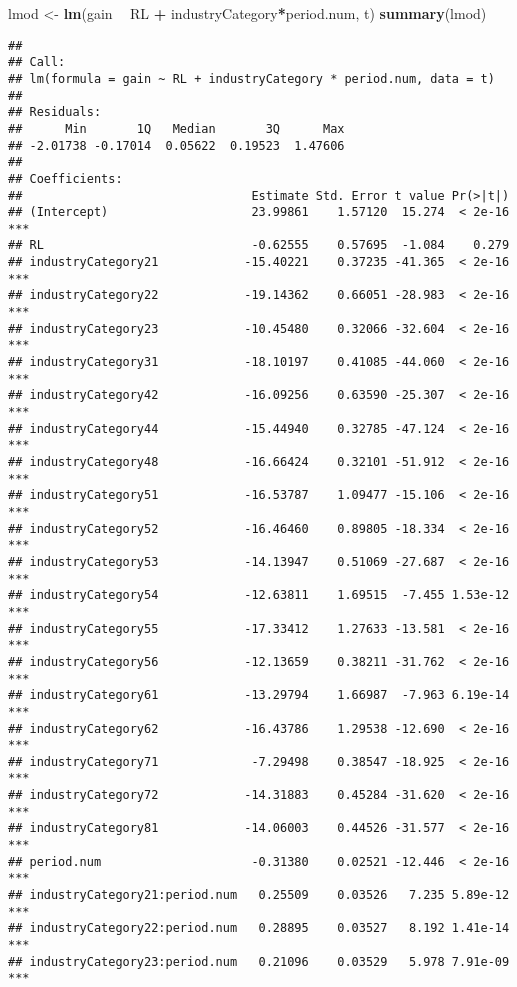 \documentclass[
]{article}
\newenvironment{Shaded}{\begin{snugshade}}{\end{snugshade}}
\newcommand{\KeywordTok}[1]{\textcolor[rgb]{0.13,0.29,0.53}{\textbf{#1}}}
\newcommand{\NormalTok}[1]{#1}
\newcommand{\OperatorTok}[1]{\textcolor[rgb]{0.81,0.36,0.00}{\textbf{#1}}}
\newcommand{\StringTok}[1]{\textcolor[rgb]{0.31,0.60,0.02}{#1}}
\begin{document}
\begin{Shaded}
\begin{Highlighting}[]
\NormalTok{lmod <-}\StringTok{ }\KeywordTok{lm}\NormalTok{(gain }\OperatorTok{~}\StringTok{ }\NormalTok{RL }\OperatorTok{+}\StringTok{ }\NormalTok{industryCategory}\OperatorTok{*}\NormalTok{period.num, t)}
\KeywordTok{summary}\NormalTok{(lmod)}
\end{Highlighting}
\end{Shaded}

\begin{verbatim}
## 
## Call:
## lm(formula = gain ~ RL + industryCategory * period.num, data = t)
## 
## Residuals:
##      Min       1Q   Median       3Q      Max 
## -2.01738 -0.17014  0.05622  0.19523  1.47606 
## 
## Coefficients:
##                                Estimate Std. Error t value Pr(>|t|)    
## (Intercept)                    23.99861    1.57120  15.274  < 2e-16 ***
## RL                             -0.62555    0.57695  -1.084    0.279    
## industryCategory21            -15.40221    0.37235 -41.365  < 2e-16 ***
## industryCategory22            -19.14362    0.66051 -28.983  < 2e-16 ***
## industryCategory23            -10.45480    0.32066 -32.604  < 2e-16 ***
## industryCategory31            -18.10197    0.41085 -44.060  < 2e-16 ***
## industryCategory42            -16.09256    0.63590 -25.307  < 2e-16 ***
## industryCategory44            -15.44940    0.32785 -47.124  < 2e-16 ***
## industryCategory48            -16.66424    0.32101 -51.912  < 2e-16 ***
## industryCategory51            -16.53787    1.09477 -15.106  < 2e-16 ***
## industryCategory52            -16.46460    0.89805 -18.334  < 2e-16 ***
## industryCategory53            -14.13947    0.51069 -27.687  < 2e-16 ***
## industryCategory54            -12.63811    1.69515  -7.455 1.53e-12 ***
## industryCategory55            -17.33412    1.27633 -13.581  < 2e-16 ***
## industryCategory56            -12.13659    0.38211 -31.762  < 2e-16 ***
## industryCategory61            -13.29794    1.66987  -7.963 6.19e-14 ***
## industryCategory62            -16.43786    1.29538 -12.690  < 2e-16 ***
## industryCategory71             -7.29498    0.38547 -18.925  < 2e-16 ***
## industryCategory72            -14.31883    0.45284 -31.620  < 2e-16 ***
## industryCategory81            -14.06003    0.44526 -31.577  < 2e-16 ***
## period.num                     -0.31380    0.02521 -12.446  < 2e-16 ***
## industryCategory21:period.num   0.25509    0.03526   7.235 5.89e-12 ***
## industryCategory22:period.num   0.28895    0.03527   8.192 1.41e-14 ***
## industryCategory23:period.num   0.21096    0.03529   5.978 7.91e-09 ***

\end{verbatim}
\end{document}
